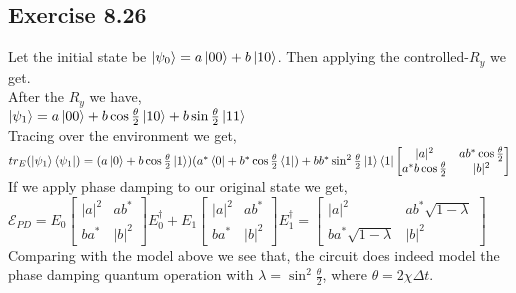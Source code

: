 \documentclass[a4paper,12pt]{article}
\begin{document}
\subsection*{Exercise 8.26}
Let the initial state be $\ket{\psi_0}=a\ket{00}+b\ket{10}$. Then applying the controlled-$R_y$ we get.\\
After the $R_y$ we have,\\
$\ket{\psi_1}=a\ket{00}+b\cos{\frac{\theta}{2}}\ket{10}+b\sin{\frac{\theta}{2}}\ket{11}$\\
Tracing over the environment we get,\\
$tr_E(\ket{\psi_1}\bra{\psi_1})=(a\ket{0}+b\cos\frac{\theta}{2}\ket{1})(a^*\bra{0}+b^*\cos\frac{\theta}{2}\bra{1})+
bb^*\sin^2\frac{\theta}{2}\ket{1}\bra{1}
\begin{bmatrix}
    |a|^2&ab^*\cos\frac{\theta}{2}\\
    a^*b\cos\frac{\theta}{2}& |b|^2
\end{bmatrix}$\\
If we apply phase damping to our original state we get,\\
$\mathcal{E}_{PD}=E_0
\begin{bmatrix}
    |a|^2&ab^*\\
    ba^*& |b|^2
\end{bmatrix}
E_0^\dagger +E_1
\begin{bmatrix}
    |a|^2&ab^*\\
    ba^*& |b|^2
\end{bmatrix}
E_1^\dagger=
\begin{bmatrix}
    |a|^2& ab^*\sqrt{1-\lambda}\\
    ba^*\sqrt{1-\lambda} & |b|^2
\end{bmatrix}$\\
Comparing with the model above we see that, the circuit does indeed model the 
phase damping quantum operation
with $\lambda=\sin^2{\frac{\theta}{2}}$, where $\theta=2\chi\Delta t$.
\end{document}
